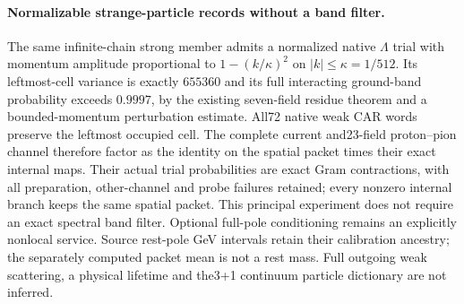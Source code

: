 \paragraph{Normalizable strange-particle records without a band filter.}
The same infinite-chain strong member admits a normalized native $\Lambda$
trial with momentum amplitude proportional to $1-(k/\kappa)^2$ on
$|k|\leq\kappa=1/512$. Its leftmost-cell variance is exactly $655360$ and its
full interacting ground-band probability exceeds $0.9997$, by the existing
seven-field residue theorem and a bounded-momentum perturbation estimate.
All72 native weak CAR words preserve the leftmost occupied cell. The complete
current and23-field proton--pion channel therefore factor as the identity on
the spatial packet times their exact internal maps. Their actual trial
probabilities are exact Gram contractions, with all preparation, other-channel
and probe failures retained; every nonzero internal branch keeps the same
spatial packet. This principal experiment does not require an exact spectral
band filter. Optional full-pole conditioning remains an explicitly nonlocal
service. Source rest-pole GeV intervals retain their calibration ancestry;
the separately computed packet mean is not a rest mass. Full outgoing weak
scattering, a physical lifetime and the3+1 continuum particle dictionary are
not inferred.
